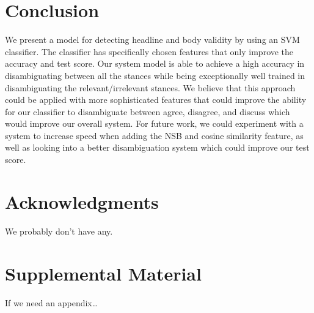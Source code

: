 \documentclass[11pt,a4paper]{article}
\begin{document}
\section{Conclusion}
We present a model for detecting headline and body validity by using an SVM classifier. The classifier has specifically chosen features that only improve the accuracy and test score. Our system model is able to achieve a high accuracy in disambiguating between all the stances while being exceptionally well trained in disambiguating the relevant/irrelevant stances. We believe that this approach could be applied with more sophisticated features that could improve the ability for our classifier to disambiguate between agree, disagree, and discuss which would improve our overall system. For future work, we could experiment with a system to increase speed when adding the NSB and cosine similarity feature, as well as looking into a better disambiguation system which could improve our test score.  

\section*{Acknowledgments}

We probably don't have any.




\appendix

\section{Supplemental Material}
If we need an appendix\ldots
\end{document}
